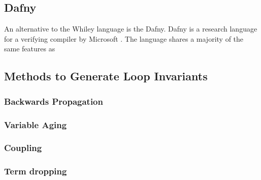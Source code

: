 \subsection{Dafny}

An alternative to the Whiley language is the Dafny.
Dafny is a research language for a verifying compiler by Microsoft
\cite{dafny-lang}.
The language shares a majority of the same features as 

\cite{dafny-started}
\cite{dafny-lang}
\cite{dafny-mech}

\subsection{Methods to Generate Loop Invariants}


\subsubsection{Backwards Propagation}

\cite{infer-postconditions}
\cite{infer-dynamic}

\subsubsection{Variable Aging}

\cite{infer-postconditions}
\cite{infer-dynamic}

\subsubsection{Coupling}

\cite{infer-postconditions}
\cite{infer-dynamic}

\subsubsection{Term dropping}

\cite{infer-postconditions}
\cite{infer-dynamic}

\cite{struct-induction}
